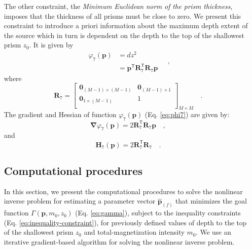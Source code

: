 The other constraint, the \textit{Minimum Euclidean norm of the prism thickness}, imposes that the thickness of all prisms must be close to zero. We present this constraint to introduce a priori information about the maximum depth extent of the source which in turn is dependent on the depth to the top of the shallowest prism $z_{0}$. It is given by
\begin{equation}\label{eq:phi7}
\begin{split}
\varphi_{7}(\mathbf{p}) &= dz^2 \\
&= \mathbf{p}^{\mathsf{T}} \mathbf{R}_{7}^{\mathsf{T}} \mathbf{R}_{7} \mathbf{p}
\end{split} \quad ,
\end{equation}
where
\begin{equation}
\mathbf{R}_{7} =
\begin{bmatrix}
\mathbf{0}_{(M-1) \times (M-1)} & \mathbf{0}_{(M-1) \times 1} \\
\mathbf{0}_{1 \times (M-1)} & 1 \\
\end{bmatrix}_{ M \times M } \quad .
\end{equation}
The gradient and Hessian of function $\varphi_{7}(\mathbf{p})$ (Eq. \ref{eq:phi7}) are given by:
\begin{equation}\label{eq:phi7_grad}
\boldsymbol{\nabla}\varphi_{7}(\mathbf{p}) = 2 \mathbf{R}_{7}^{\mathsf{T}} \mathbf{R}_{7} \mathbf{p} \quad ,
\end{equation}
and
\begin{equation}\label{eq:phi7_hessian}
\mathbf{H}_{7}(\mathbf{p}) = 2 \mathbf{R}^{\mathsf{T}}_{7}\mathbf{R}_{7} \quad .
\end{equation}

\subsection{Computational procedures}

In this section, we present the computational procedures 
to solve the nonlinear inverse problem for estimating a parameter vector 
$\hat{\mathbf{p}}_{(f)}$ that minimizes the goal function 
$\Gamma(\mathbf{p}, m_{0}, z_{0})$ (Eq. \ref{eq:gamma}), subject to the inequality
constraints (Eq. \ref{eq:inequality-constraint}), for previously defined values of
depth to the top of the shallowest prism $z_{0}$ and total-magnetization intensity
$m_{0}$. We use an iterative gradient-based algorithm for solving the nonlinear
inverse problem.

